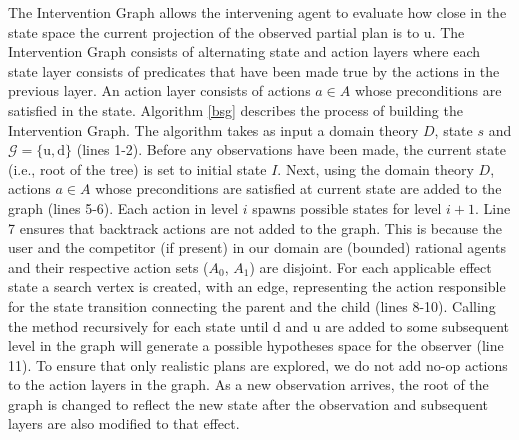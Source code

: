 \documentclass[letterpaper]{article}
\theoremstyle{plain}
\begin{document}
The Intervention Graph allows the intervening agent to evaluate how close in the state space the current projection of the observed partial plan is to $\mathrm{u}$. The Intervention Graph consists of alternating state and action layers where each state layer consists of predicates that have been made true by the actions in the previous layer. An action layer consists of actions $a\in A$ whose preconditions are satisfied in the state. Algorithm \ref{bsg} describes the process of building the Intervention Graph. The algorithm takes as input a domain theory $D$, state $s$ and $\mathcal{G}=\lbrace\mathrm{u},\mathrm{d}\rbrace$ (lines 1-2). Before any observations have been made, the current state (i.e., root of the tree) is set to initial state $I$. Next, using the domain theory $D$, actions  $a\in A$ whose preconditions are satisfied at current state are added to the graph (lines 5-6). Each action in level $i$ spawns possible states for level $i+1$. Line 7 ensures that backtrack actions are not added to the graph. This is because the user and the competitor (if present) in our domain are (bounded) rational agents and their respective action sets ($A_0$, $A_1$) are disjoint. For each applicable effect state a search vertex is created, with an edge, representing the action responsible for the state transition connecting the parent and the child (lines 8-10). Calling the method recursively for each state until $\mathrm{d}$ and $\mathrm{u}$ are added to some subsequent level in the graph will generate a possible hypotheses space for the observer (line 11). To ensure that only realistic plans are explored, we do not add no-op actions to the action layers in the graph. As a new observation arrives, the root of the graph is changed to reflect the new state after the observation and subsequent layers are also modified to that effect.  
\end{document}
